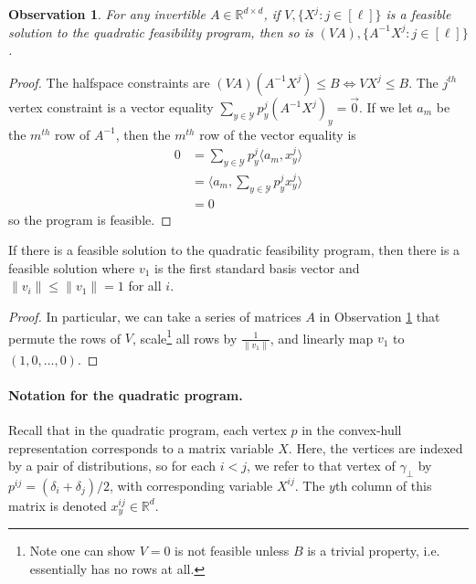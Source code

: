 \documentclass[anon]{colt2020} %
\newcommand{\Comments}{1}
\newcommand{\mynote}[2]{\ifnum\Comments=1\textcolor{#1}{#2}\fi}
\newcommand{\jessie}[1]{\mynote{purple}{[JF: #1]}}
\newcommand{\reals}{\mathbb{R}}
\newcommand{\Y}{\mathcal{Y}}
\newcommand{\ellabs}[1]{\ell_{#1}}
\newcommand{\inprod}[2]{\langle #1, #2 \rangle}%
\newtheorem{observation}{Observation}
\begin{document}
\begin{observation} \label{obs:qfp-invariant-lin}
	For any invertible $A \in \reals^{d \times d}$, if $V,\{X^j : j \in [\ell]\}$ is a feasible solution to the quadratic feasibility program, then so is $(VA),\{A^{-1}X^j : j \in [\ell]\}$.
\end{observation}
\begin{proof}
	The halfspace constraints are $(VA)(A^{-1}X^j) \leq B \iff VX^{j} \leq B$.
	The $j^{th}$ vertex constraint is a vector equality $\sum_{y \in \Y} p^j_y (A^{-1}X^j)_y = \vec{0}$.
	If we let $a_m$ be the $m^{th}$ row of $A^{-1}$, then the $m^{th}$ row of the vector equality is
	\begin{align*}
	0 &= \sum_{y \in \Y} p^j_y \inprod{a_m}{x^j_y}  \\
	&= \inprod{a_m}{\sum_{y \in \Y} p^j_y x^j_y}  \\
	&= 0
	\end{align*}
	so the program is feasible.
\end{proof}

\begin{corollary} \label{cor:qfp-wlog-v1}
	If there is a feasible solution to the quadratic feasibility program, then there is a feasible solution where $v_1$ is the first standard basis vector and $\|v_i\| \leq \|v_1\| = 1$ for all $i$.
\end{corollary}
\begin{proof}
	In particular, we can take a series of matrices $A$ in Observation \ref{obs:qfp-invariant-lin} that permute the rows of $V$, scale\footnote{Note one can show $V = 0$ is not feasible unless $B$ is a trivial property, i.e. essentially has no rows at all.} all rows by $\frac{1}{\|v_1\|}$, and linearly map $v_1$ to $(1,0,\dots,0)$.
\end{proof}

\paragraph{Notation for the quadratic program.}
Recall that in the quadratic program, each vertex $p$ in the convex-hull representation corresponds to a matrix variable $X$.
Here, the vertices are indexed by a pair of distributions, so for each $i < j$, we refer to that vertex of $\gamma_{\bot}$ by $p^{ij} = (\delta_i + \delta_j)/2$, with corresponding variable $X^{ij}$.
The $y$th column of this matrix is denoted $x^{ij}_y \in \reals^d$.
\end{document}
